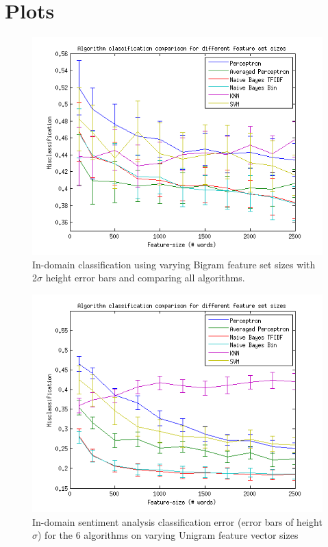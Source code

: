 \chapter{Plots}
\begin{figure}[H]
\centering
\includegraphics[scale = 1]{../Plottar/feature-size100-2500bigram.png}
\caption{In-domain classification using varying Bigram feature set sizes with 2$\sigma$ height error bars and comparing all algorithms.}
\end{figure} 

\begin{figure}[H]
\centering
\includegraphics[scale = 1]{../Plottar/feature-size100-2500all.png}
\caption{In-domain sentiment analysis classification error (error bars of height $\sigma$) for the 6 algorithms on varying Unigram feature vector sizes}
\end{figure} 

